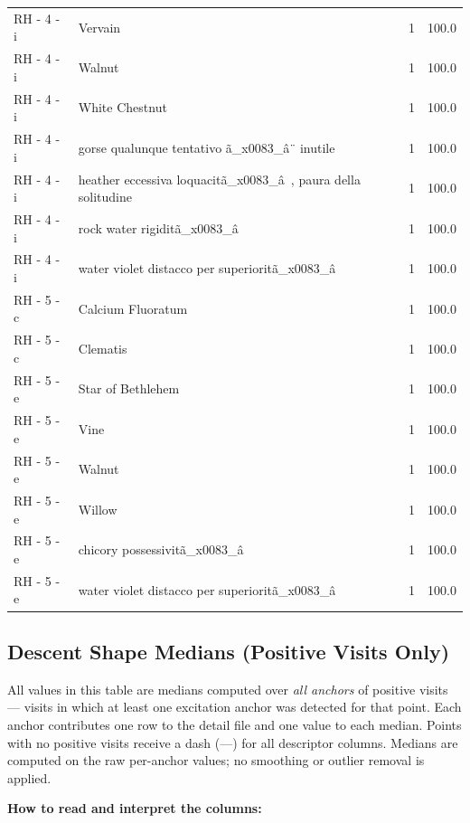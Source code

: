 \documentclass[a4paper,11pt]{article}
\begin{document}
\begin{footnotesize}
\begin{longtable}{p{3.5cm}p{7.5cm}rr}
RH - 4 - i & Vervain & 1 & 100.0 \\
RH - 4 - i & Walnut & 1 & 100.0 \\
RH - 4 - i & White Chestnut & 1 & 100.0 \\
RH - 4 - i & gorse qualunque tentativo ã\_x0083\_â¨ inutile & 1 & 100.0 \\
RH - 4 - i & heather eccessiva loquacitã\_x0083\_â , paura della solitudine & 1 & 100.0 \\
RH - 4 - i & rock water rigiditã\_x0083\_â & 1 & 100.0 \\
RH - 4 - i & water violet distacco per superioritã\_x0083\_â & 1 & 100.0 \\
RH - 5 - c & Calcium Fluoratum & 1 & 100.0 \\
RH - 5 - c & Clematis & 1 & 100.0 \\
RH - 5 - e & Star of Bethlehem & 1 & 100.0 \\
RH - 5 - e & Vine & 1 & 100.0 \\
RH - 5 - e & Walnut & 1 & 100.0 \\
RH - 5 - e & Willow & 1 & 100.0 \\
RH - 5 - e & chicory possessivitã\_x0083\_â & 1 & 100.0 \\
RH - 5 - e & water violet distacco per superioritã\_x0083\_â & 1 & 100.0 \\
\end{longtable}
\end{footnotesize}

\subsection{Descent Shape Medians (Positive Visits Only)}

All values in this table are medians computed over \emph{all anchors} of positive visits ---
visits in which at least one excitation anchor was detected for that point. Each anchor
contributes one row to the detail file and one value to each median. Points with no positive
visits receive a dash (---) for all descriptor columns.
Medians are computed on the raw per-anchor values; no smoothing or outlier removal is
applied.

\medskip
\noindent\textbf{How to read and interpret the columns:}
\end{document}

